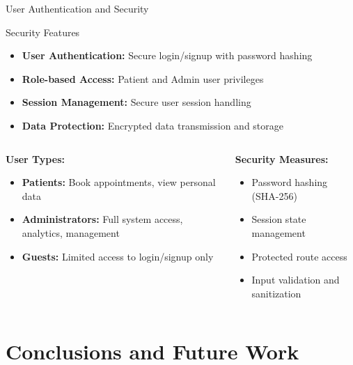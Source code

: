 \documentclass[aspectratio=169]{beamer}
\begin{document}
\begin{frame}{User Authentication and Security}
\begin{block}{Security Features}
\begin{itemize}
    \item \textbf{User Authentication:} Secure login/signup with password hashing
    \item \textbf{Role-based Access:} Patient and Admin user privileges
    \item \textbf{Session Management:} Secure user session handling
    \item \textbf{Data Protection:} Encrypted data transmission and storage
\end{itemize}
\end{block}

\vspace{0.5cm}

\begin{columns}
\begin{column}{0.5\textwidth}
\textbf{User Types:}
\begin{itemize}
    \item \textbf{Patients:} Book appointments, view personal data
    \item \textbf{Administrators:} Full system access, analytics, management
    \item \textbf{Guests:} Limited access to login/signup only
\end{itemize}
\end{column}
\begin{column}{0.5\textwidth}
\textbf{Security Measures:}
\begin{itemize}
    \item Password hashing (SHA-256)
    \item Session state management
    \item Protected route access
    \item Input validation and sanitization
\end{itemize}
\end{column}
\end{columns}
\end{frame}

\section{Conclusions and Future Work}
\end{document}
